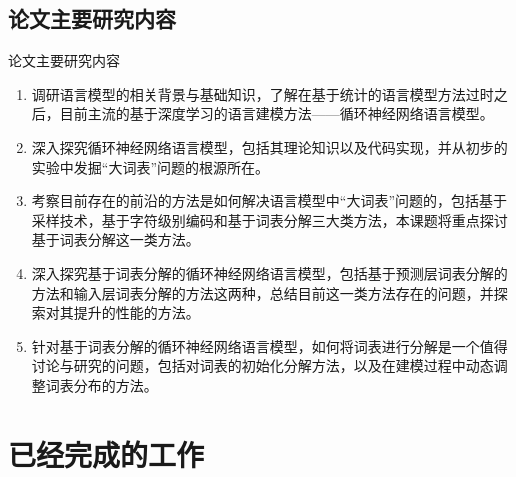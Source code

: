 \documentclass[14pt]{Bredelebeamer}
\begin{document}
\subsection{论文主要研究内容}
\begin{frame}{论文主要研究内容}

\begin{enumerate}
  \item 调研语言模型的相关背景与基础知识，了解在基于统计的语言模型方法过时之后，目前主流的基于深度学习的语言建模方法——循环神经网络语言模型。
  \item 深入探究循环神经网络语言模型，包括其理论知识以及代码实现，并从初步的实验中发掘“大词表”问题的根源所在。
  \item 考察目前存在的前沿的方法是如何解决语言模型中“大词表”问题的，包括基于采样技术，基于字符级别编码和基于词表分解三大类方法，本课题将重点探讨基于词表分解这一类方法。
  \item 深入探究基于词表分解的循环神经网络语言模型，包括基于预测层词表分解的方法和输入层词表分解的方法这两种，总结目前这一类方法存在的问题，并探索对其提升的性能的方法。
  \item 针对基于词表分解的循环神经网络语言模型，如何将词表进行分解是一个值得讨论与研究的问题，包括对词表的初始化分解方法，以及在建模过程中动态调整词表分布的方法。
\end{enumerate}


\end{frame}


\section{已经完成的工作}
\end{document}
